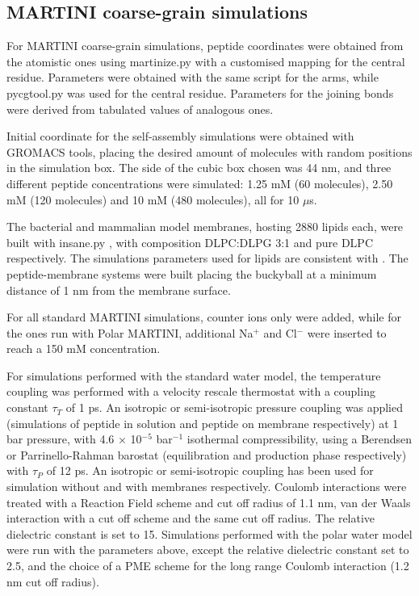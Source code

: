 \subsection{MARTINI coarse-grain simulations} \label{sec:MARTINI_sim_det}
For MARTINI \citep{Marrink2007, Monticelli2008} coarse-grain simulations, peptide coordinates were obtained from the atomistic ones using martinize.py \citep{DeJong2013} with a customised mapping for the central residue. Parameters were obtained with the same script for the arms, while pycgtool.py \citep{Graham2017} was used for the central residue. Parameters for the joining bonds were derived from tabulated values of analogous ones.

Initial coordinate for the self-assembly simulations were obtained with GROMACS tools, placing the desired amount of molecules with random positions in the simulation box.
%
The side of the cubic box chosen was 44 nm, and three different peptide concentrations were simulated: 1.25 mM (60 molecules), 2.50 mM (120 molecules) and 10 mM (480 molecules), all for 10 $\mu$s.

The bacterial and mammalian model membranes, hosting 2880 lipids each, were built with insane.py \citep{Wassenaar2015}, with composition DLPC:DLPG 3:1 and pure DLPC respectively. The simulations parameters used for lipids are consistent with \citet{SiewertJ.Marrink2003}. The peptide-membrane systems were built placing the buckyball at a minimum distance of 1 nm from the membrane surface.

For all standard MARTINI simulations, counter ions only were added, while for the ones run with Polar MARTINI, additional Na$^+$ and Cl$^-$ were inserted to reach a 150 mM concentration.

For simulations performed with the standard water model, the temperature coupling was performed with a velocity rescale thermostat \citep{Bussi2007} with a coupling constant $\tau _T$ of 1 ps. An isotropic or semi-isotropic pressure coupling was applied (simulations of peptide in solution and peptide on membrane respectively) at 1 bar pressure, with 4.6 $\times$ 10$^{-5}$ bar$^{-1}$ isothermal compressibility, using a Berendsen \citep{Berendsen1984} or Parrinello-Rahman barostat \citep{Parrinello1981} (equilibration and production phase respectively) with $\tau _P$ of 12 ps. An isotropic or semi-isotropic coupling has been used for simulation without and with membranes respectively.
%
Coulomb interactions were treated with a Reaction Field scheme \citep{Tironi1995} and cut off radius of 1.1 nm, van der Waals interaction with a cut off scheme and the same cut off radius. The relative dielectric constant is set to 15.
%
Simulations performed with the polar water model were run with the parameters above, except the relative dielectric constant set to 2.5, and the choice of a PME scheme for the long range Coulomb interaction (1.2 nm cut off radius).

